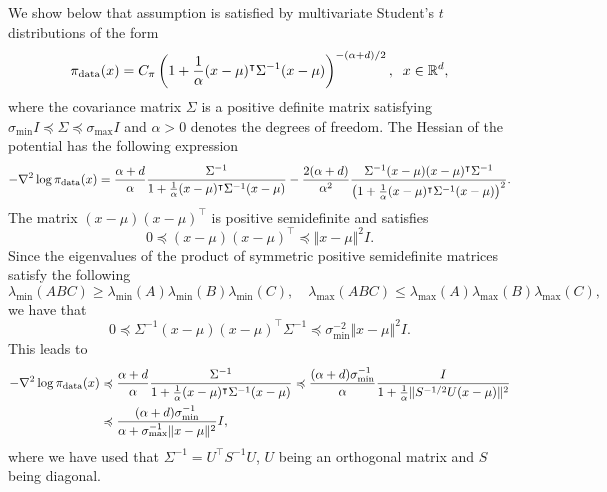 We show below that assumption  is satisfied by multivariate Student's $t$ distributions of the form
\begin{equation*}
    \operatorname*{\pi_{\text{data}}}(x) = C_{\pi} \left( 1 + \frac{1}{\alpha} (x-\mu)^{\intercal} \Sigma^{-1} (x-\mu)\right)^{-(\alpha + d)/2}, \;\; x\in\mathbb{R}^d,
\end{equation*}
where the covariance matrix $\Sigma$ is a positive definite matrix satisfying $\sigma_{\min} I\preccurlyeq\Sigma\preccurlyeq \sigma_{\max} I$ and $\alpha>0$ denotes the degrees of freedom.
The Hessian of the potential has the following expression
\begin{equation*}
    -\nabla^2 \log \operatorname*{\pi_{\text{data}}}(x) = \frac{\alpha + d}{\alpha} \frac{ \Sigma^{-1}}{1 + \frac{1}{\alpha} (x-\mu)^{\intercal}\Sigma^{-1}(x-\mu)} -\frac{2(\alpha + d)}{\alpha^2}\frac{ \Sigma^{-1}(x-\mu)(x-\mu)^{\intercal}\Sigma^{-1}}{\left(1 + \frac{1}{\alpha} (x-\mu)^{\intercal}\Sigma^{-1}(x-\mu)\right)^2}.
\end{equation*}
The matrix $(x-\mu)(x-\mu)^{\intercal}$ is positive semidefinite and satisfies
\begin{equation*}
    0 \preccurlyeq (x-\mu)(x-\mu)^{\intercal}\preccurlyeq \Vert x-\mu\Vert^2 I.
\end{equation*}
Since the eigenvalues of the product of symmetric positive semidefinite matrices satisfy the following
\begin{equation*}
    \lambda_{\min}(ABC)\geq \lambda_{\min}(A)\lambda_{\min}(B)\lambda_{\min}(C),\quad \lambda_{\max}(ABC)\leq \lambda_{\max}(A)\lambda_{\max}(B)\lambda_{\max}(C),
\end{equation*}
we have that 
\begin{equation*}
    0\preccurlyeq \Sigma^{-1}(x-\mu)(x-\mu)^{\intercal}\Sigma^{-1} \preccurlyeq \sigma_{\min}^{-2} \Vert x-\mu\Vert^2 I.
\end{equation*}
This leads to 
\begin{align*}
    -\nabla^2\log\operatorname*{\pi_{\text{data}}}(x)&\preccurlyeq \frac{\alpha + d}{\alpha} \frac{ \Sigma^{-1}}{1 + \frac{1}{\alpha} (x-\mu)^{\intercal}\Sigma^{-1}(x-\mu)}\preccurlyeq \frac{(\alpha + d) \sigma_{\min}^{-1}}{\alpha} \frac{I}{1 + \frac{1}{\alpha} \Vert S^{-1/2} U (x-\mu)\Vert^2}\\
    &\preccurlyeq \frac{(\alpha + d) \sigma_{\min}^{-1}}{\alpha + {\sigma_{\max}^{-1}} \Vert x-\mu\Vert^2} I,
\end{align*}
where we have used that $\Sigma^{-1} = U^\intercal S^{-1}U$, $U$ being an orthogonal matrix and $S$ being diagonal.
